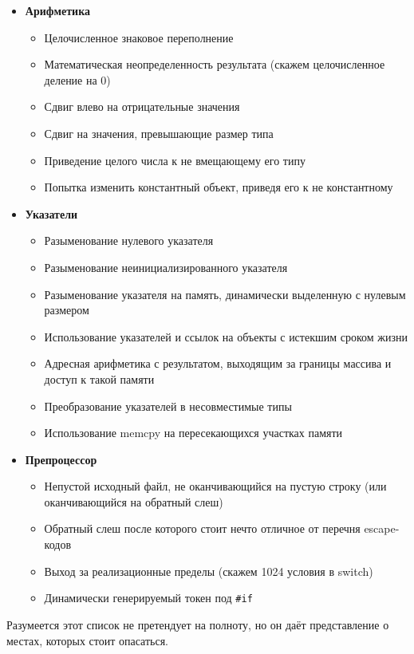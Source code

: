 \documentclass[a4paper,12pt,oneside]{book}
\begin{document}
\begin {itemize}
\item \textbf {Арифметика}
\begin {itemize}
\item Целочисленное знаковое переполнение
\item Математическая неопределенность результата (скажем целочисленное деление на 0)
\item Сдвиг влево на отрицательные значения
\item Сдвиг на значения, превышающие размер типа
\item Приведение целого числа к не вмещающему его типу
\item Попытка изменить константный объект, приведя его к не константному
\end {itemize}
\item \textbf {Указатели}
\begin {itemize}
\item Разыменование нулевого указателя
\item Разыменование неинициализированного указателя
\item Разыменование указателя на память, динамически выделенную с нулевым размером
\item Использование указателей и ссылок на объекты с истекшим сроком жизни
\item Адресная арифметика с результатом, выходящим за границы массива и доступ к такой памяти
\item Преобразование указателей в несовместимые типы
\item Использование memcpy на пересекающихся участках памяти
\end {itemize}
\item \textbf {Препроцессор}
\begin {itemize}
\item Непустой исходный файл, не оканчивающийся на пустую строку (или оканчивающийся на обратный слеш)
\item Обратный слеш после которого стоит нечто отличное от перечня escape-кодов
\item Выход за реализационные пределы (скажем 1024 условия в switch)
\item Динамически генерируемый токен под \lstinline!#if!
\end {itemize}
\end {itemize}

Разумеется этот список не претендует на полноту, но он даёт представление о местах, которых стоит опасаться.
\end{document}
